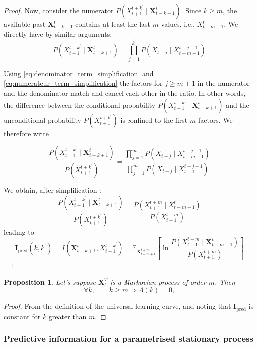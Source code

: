 \documentclass{article}
\newtheorem{proposition}[theorem]{Proposition}
\begin{document}
\begin{proof}
Now, consider the numerator $P\left(X_{t+1}^{t+k^{\prime}} \mid \mathbf{X}_{t-k+1}^t\right)$. Since $k \geq m$, the available past $\mathbf{X}_{t-k+1}^t$ contains at least the last $m$ values, i.e., $X_{t-m+1}^t$. We directly have by similar arguments, 
\begin{equation}\label{eq:numerateur_term_simplification}
P\left(X_{t+1}^{t+k^{\prime}} \mid \mathbf{X}_{t-k+1}^t\right)=\prod_{j=1}^{k^{\prime}} P\left(X_{t+j} \mid X_{t-m+1}^{t+j-1}\right)
\end{equation}


Using \ref{eq:denominator_term_simplification} and \ref{eq:numerateur_term_simplification} the factors for $j \geq m+1$ in the numerator and the denominator match and cancel each other in the ratio. In other words, the difference between the conditional probability $P\left(X_{t+1}^{t+k^{\prime}} \mid \mathbf{X}_{t-k+1}^t\right)$ and the unconditional probability $P\left(X_{t+1}^{t+k^{\prime}}\right)$ is confined to the first $m$ factors. We therefore write

$$
\frac{P\left(X_{t+1}^{t+k^{\prime}} \mid \mathbf{X}_{t-k+1}^t\right)}{P\left(X_{t+1}^{t+k^{\prime}}\right)}=\frac{\prod_{j=1}^m P\left(X_{t+j} \mid X_{t-m+1}^{t+j-1}\right)}{\prod_{j=1}^m P\left(X_{t+j} \mid X_{t+1}^{t+j-1}\right)}
$$

We obtain, after simplification : 
$$
\frac{P\left(X_{t+1}^{t+k^{\prime}} \mid \mathbf{X}_{t-k+1}^t\right)}{P\left(X_{t+1}^{t+k^{\prime}}\right)}=\frac{P\left(X_{t+1}^{t+m} \mid X_{t-m+1}^t\right)}{P\left(X_{t+1}^{t+m}\right)}
$$
leading to 
$$\mathbf{I}_{\text{pred}}\left(k, k^{\prime}\right)=I\left(\mathbf{X}_{t-k+1}^t, X_{t+1}^{t+k^{\prime}}\right)=\mathbb{E}_{\mathbf{X}_{t-m+1}^{t+m}}\left[\ln \frac{P\left(X_{t+1}^{t+m} \mid \mathbf{X}_{t-m+1}^t\right)}{P\left(X_{t+1}^{t+m}\right)}\right]$$
\end{proof}



\begin{proposition}\label{proof:markovian_process_universal_learning_curve} Let's suppose $\mathbf{X}_{t}^{T}$ is a Markovian process of order $m$. Then 
$$\forall k, \qquad k\geq m \Rightarrow \Lambda(k) = 0,$$
\end{proposition}
\begin{proof}
From the definition of the universal learning curve, and noting that $\mathbf{I}_{\text{pred}}$ is constant for $k$ greater than $m$.
\end{proof}

\subsubsection{Predictive information for a parametrised stationary process}
\label{proof:parametrized_process_evoPred_limit}
\end{document}

